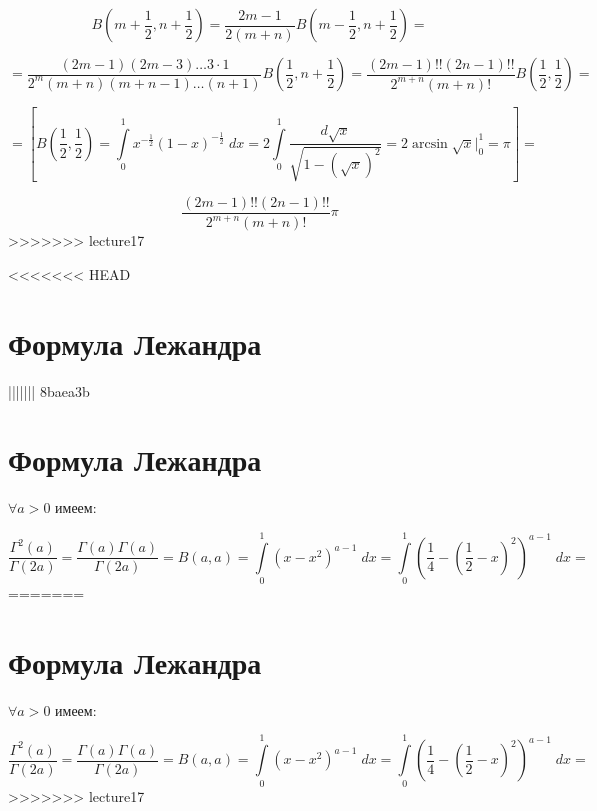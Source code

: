 \documentclass[../../main.tex]{subfiles}
\begin{document}
\begin{enumerate}
	\[  B\left( m+\frac{1}{2}, n+\frac{1}{2} \right) = \frac{2m - 1}{2(m+n)} 
	B\left( m-\frac{1}{2}, n+\frac{1}{2} \right) = \]
	
	\[ = \frac{(2m-1)(2m-3) \dots 3 \cdot 1}{2^m (m+n)(m+n-1)\dots (n+1)} B\left( 
	\frac{1}{2}, n+\frac{1}{2} \right) = \frac{(2m-1)!! (2n-1)!! }{2^{m+n} 
	(m+n)!} B\left( \frac{1}{2}, \frac{1}{2} \right) =  \]
	
	\[ = \left[  B\left( \frac{1}{2}, \frac{1}{2} \right) = \int\limits_{0}^{1} 
	x^{-\frac{1}{2}} \left( 1-x \right)^{-\frac{1}{2}} \; dx = 2 
	\int\limits_{0}^{1} \frac{d \sqrt{x} }{\sqrt{1 - \left(\sqrt{x} \right)^2 }} 
	= 2 \arcsin{\sqrt{x}} \bigg|_{0}^{1} = \pi  \right] =     \]
	
	\[   \frac{(2m-1)!! (2n-1)!! }{2^{m+n} (m+n)!} \pi    \]
>>>>>>> lecture17
\end{enumerate}
<<<<<<< HEAD

\section{Формула Лежандра}
||||||| 8baea3b
	\section{Формула Лежандра}
	
	$\forall a > 0$ имеем:
	
	\[ \frac{\Gamma^2(a)}{\Gamma(2a)} = \frac{\Gamma(a) \Gamma(a)}{\Gamma(2a)} = B(a,a) = \int\limits_{0}^{1} \left(x-x^2 \right) ^{a-1} \; dx = \int\limits_{0}^{1} \left(\frac{1}{4} - \left( \frac{1}{2} - x\right)^2  \right) ^{a-1} \; dx =  \]
=======
	\section{Формула Лежандра}
	
	$\forall a > 0$ имеем:
	
	\[ \frac{\Gamma^2(a)}{\Gamma(2a)} = \frac{\Gamma(a) \Gamma(a)}{\Gamma(2a)} = 
	B(a,a) = \int\limits_{0}^{1} \left(x-x^2 \right) ^{a-1} \; dx = 
	\int\limits_{0}^{1} \left(\frac{1}{4} - \left( \frac{1}{2} - x\right)^2  
	\right) ^{a-1} \; dx =  \]
>>>>>>> lecture17
	
\end{document}
